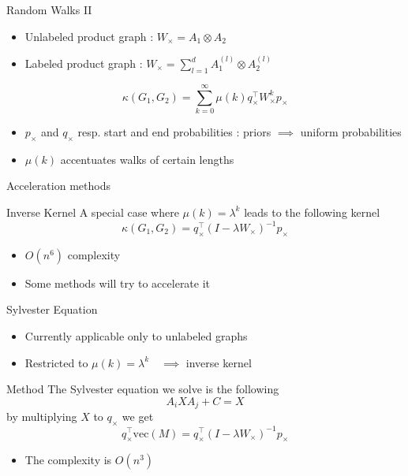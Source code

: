 \documentclass[compress]{beamer}
\begin{document}
\begin{frame}{Random Walks II}
	\begin{itemize}
		\item Unlabeled product graph : $W_{\times}=A_1\otimes A_2$
		\item Labeled product graph : $W_{\times}=\sum\limits_{l=1}^{d} A_1^{(l)} \otimes A_2^{(l)}$
	\end{itemize}
	\begin{equation*}
	\kappa(G_1,G_2) = \sum\limits_{k=0}^{\infty}\mu(k)q_{\times}^{\top}W_{\times}^{k}p_{\times}
	\end{equation*}
	\begin{itemize}
		\item $p_\times$ and $q_\times$ resp. start and end probabilities : priors $\implies$ uniform probabilities
		\item $\mu(k)$ accentuates walks of certain lengths
	\end{itemize}
\end{frame}
\begin{frame}{Acceleration methods}
\begin{block}{Inverse Kernel}
A special case where $\mu(k)=\lambda^k$ leads to the following kernel
	\begin{equation*}
	\kappa(G_1,G_2)=q_{\times}^{\top}(I-\lambda W_\times)^{-1}p_{\times}
	\end{equation*}
\end{block}
\begin{itemize}
	\item $O(n^6)$ complexity
	\item Some methods will try to accelerate it
\end{itemize}
\end{frame}
\begin{frame}{Sylvester Equation}
\begin{itemize}
	\item Currently applicable only to unlabeled graphs
	\item Restricted to $\mu(k)=\lambda^k\quad\implies$ inverse kernel
\end{itemize}
\begin{block}{Method}
	The Sylvester equation we solve is the following
	\begin{equation*}
	A_iXA_j+C=X
	\end{equation*}
	by multiplying $X$ to $q_\times$ we get 
	\begin{equation*}
		q_{\times}^{\top}\text{vec}(M)=q_{\times}^{\top}(I-\lambda W_{\times})^{-1}p_{\times}
	\end{equation*}
\end{block}
\begin{itemize}
	\item The complexity is $O(n^3)$
\end{itemize}
\end{frame}
\end{document}
